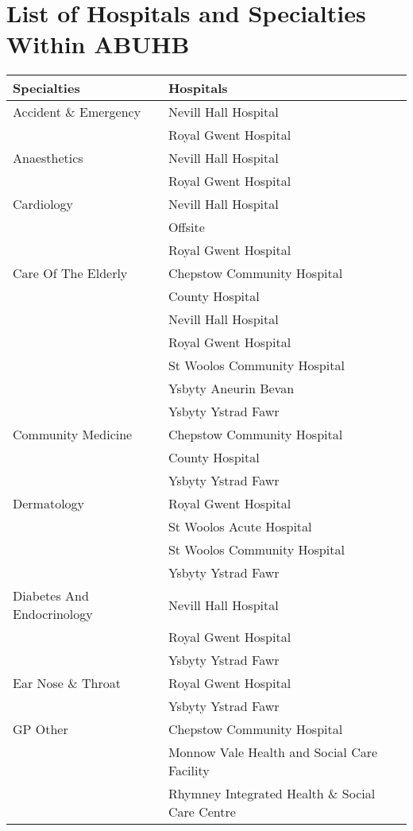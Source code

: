 \documentclass[thesis.tex]{subfiles}
\begin{document}
\chapter{List of Hospitals and Specialties Within ABUHB}\label{App:Hospitals}


\begin{center}
    \begin{longtable}{ll}\toprule
    \textbf{Specialties}   & \textbf{Hospitals}  \\\midrule\endfirsthead
        Accident \& Emergency &	Nevill Hall Hospital\\
	&Royal Gwent Hospital\\\midrule
Anaesthetics	&Nevill Hall Hospital\\
	&Royal Gwent Hospital\\\midrule
Cardiology&	Nevill Hall Hospital\\
	&Offsite\\
	&Royal Gwent Hospital\\\midrule 
Care Of The Elderly&	Chepstow Community Hospital\\
	&County Hospital\\
	&Nevill Hall Hospital\\
	&Royal Gwent Hospital\\
	&St Woolos Community Hospital\\
	&Ysbyty Aneurin Bevan\\
	&Ysbyty Ystrad Fawr\\\midrule
Community Medicine	&Chepstow Community Hospital\\
	&County Hospital\\
	&Ysbyty Ystrad Fawr\\\midrule
Dermatology	&Royal Gwent Hospital\\
	&St Woolos Acute Hospital\\
	&St Woolos Community Hospital\\
	&Ysbyty Ystrad Fawr\\\midrule
Diabetes And Endocrinology&	Nevill Hall Hospital\\
	&Royal Gwent Hospital\\
	&Ysbyty Ystrad Fawr\\\midrule
Ear Nose \& Throat&	Royal Gwent Hospital\\
	&Ysbyty Ystrad Fawr\\\midrule
GP Other&	Chepstow Community Hospital\\
	&Monnow Vale Health and Social Care Facility\\
	&Rhymney Integrated Health \& Social Care Centre\\\midrule

\end{longtable}
\end{center}
\end{document}
